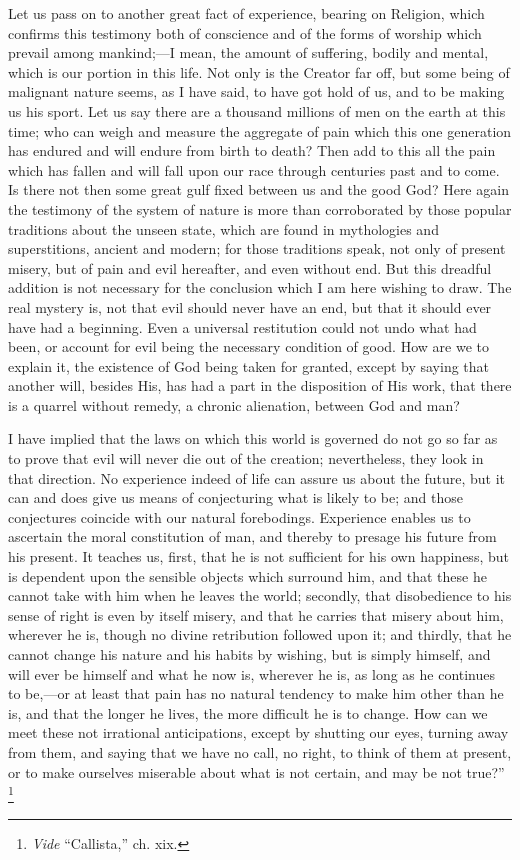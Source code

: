 Let us pass on to another great fact of experience, bearing on
Religion, which confirms this testimony both of conscience and of the
forms of worship which prevail among mankind;—I mean, the amount of
suffering, bodily and mental, which is our portion in this life. Not
only is the Creator far off, but some being of malignant nature seems,
as I have said, to have got hold of us, and to be making us his sport.
Let us say there are a thousand millions of men on the earth at this
time; who can weigh and measure the aggregate of pain which this one
generation has endured and will endure from birth to death? Then add
to this all the pain which has fallen and will fall upon our race
through centuries past and to come. Is there not then some great gulf
fixed between us and the good God? Here again the testimony of the
system of nature is more than corroborated by those popular traditions
about the unseen state, which are found in mythologies and
superstitions, ancient and modern; for those traditions speak, not
only of present misery, but of pain and evil hereafter, and even
without end. But this dreadful addition is not necessary for the
conclusion which I am here wishing to draw. The real mystery is,
not that evil should never have an end, but that it should ever have
had a beginning. Even a universal restitution could not undo what had
been, or account for evil being the necessary condition of good. How
are we to explain it, the existence of God being taken for granted,
except by saying that another will, besides His, has had a part in the
disposition of His work, that there is a quarrel without remedy, a
chronic alienation, between God and man?

I have implied that the laws on which this world is governed do not
go so far as to prove that evil will never die out of the creation;
nevertheless, they look in that direction. No experience indeed of
life can assure us about the future, but it can and does give us means
of conjecturing what is likely to be; and those conjectures coincide
with our natural forebodings. Experience enables us to ascertain the
moral constitution of man, and thereby to presage his future from his
present. It teaches us, first, that he is not sufficient for his own
happiness, but is dependent upon the sensible objects which surround
him, and that these he cannot take with him when he leaves the world;
secondly, that disobedience to his sense of right is even by itself
misery, and that he carries that misery about him, wherever he is,
though no divine retribution followed upon it; and thirdly, that he
cannot change his nature and his habits by wishing, but is simply
himself, and will ever be himself and what he now is, wherever he is,
as long as he continues to be,—or at least that pain has no natural
tendency to make him other than he is, and that the longer he lives,
the more difficult he is to change. How can we meet these not
irrational anticipations, except by shutting our eyes, turning away
from them, and saying that we have no call, no right, to think of them
at present, or to make ourselves miserable about what is not certain,
and may be not true?'' \footnote{\emph{Vide}
``Callista,'' ch. xix.}

